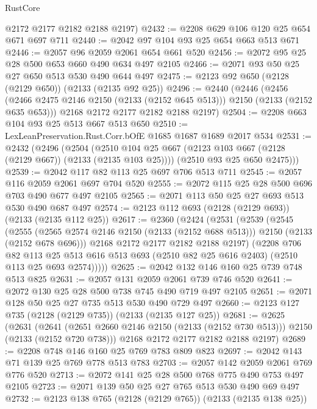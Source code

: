 \begin{lexlean}{RustCore}
\begin{coremodule}
      @2172
      @2177
      @2182
      @2188
      @2197)
@2432 := @2208 @629 @106 @120 @25 @654 @671 @697 @711
@2440 := @2042 @97 @104 @93 @25 @654 @663 @513 @671
@2446 := @2057 @96 @2059 @2061 @654 @661 @520
@2456 := @2072 @95 @25 @28 @500 @653 @660 @490 @634 @497 @2105
@2466 := @2071 @93 @50 @25 @27 @650 @513 @530 @490 @644 @497
@2475 := @2123 @92 @650 (@2128 (@2129 @650)) (@2133 (@2135 @92 @25))
@2496 := @2440
    (@2446
      (@2456 (@2466 @2475 @2146 @2150 (@2133 (@2152 @645 @513))) @2150 (@2133 (@2152 @635 @653)))
      @2168
      @2172
      @2177
      @2182
      @2188
      @2197)
@2504 := @2208 @663 @104 @93 @25 @513 @667 @513 @650
@2510 := LexLeanPreservation.Rust.Corr.bOfE @1685 @1687 @1689 @2017 @534
@2531 := @2432
    (@2496
      (@2504
        (@2510 @104 @25 @667 (@2123 @103 @667 (@2128 (@2129 @667)) (@2133 (@2135 @103 @25))))
        (@2510 @93 @25 @650 @2475)))
@2539 := @2042 @117 @82 @113 @25 @697 @706 @513 @711
@2545 := @2057 @116 @2059 @2061 @697 @704 @520
@2555 := @2072 @115 @25 @28 @500 @696 @703 @490 @677 @497 @2105
@2565 := @2071 @113 @50 @25 @27 @693 @513 @530 @490 @687 @497
@2574 := @2123 @112 @693 (@2128 (@2129 @693)) (@2133 (@2135 @112 @25))
@2617 := @2360
    (@2424
      (@2531
        (@2539
          (@2545
            (@2555
              (@2565 @2574 @2146 @2150 (@2133 (@2152 @688 @513)))
              @2150
              (@2133 (@2152 @678 @696)))
            @2168
            @2172
            @2177
            @2182
            @2188
            @2197)
          (@2208
            @706
            @82
            @113
            @25
            @513
            @616
            @513
            @693
            (@2510 @82 @25 @616 @2403)
            (@2510 @113 @25 @693 @2574)))))
@2625 := @2042 @132 @146 @160 @25 @739 @748 @513 @825
@2631 := @2057 @131 @2059 @2061 @739 @746 @520
@2641 := @2072 @130 @25 @28 @500 @738 @745 @490 @719 @497 @2105
@2651 := @2071 @128 @50 @25 @27 @735 @513 @530 @490 @729 @497
@2660 := @2123 @127 @735 (@2128 (@2129 @735)) (@2133 (@2135 @127 @25))
@2681 := @2625
    (@2631
      (@2641 (@2651 @2660 @2146 @2150 (@2133 (@2152 @730 @513))) @2150 (@2133 (@2152 @720 @738)))
      @2168
      @2172
      @2177
      @2182
      @2188
      @2197)
@2689 := @2208 @748 @146 @160 @25 @769 @783 @809 @823
@2697 := @2042 @143 @71 @139 @25 @769 @778 @513 @783
@2703 := @2057 @142 @2059 @2061 @769 @776 @520
@2713 := @2072 @141 @25 @28 @500 @768 @775 @490 @753 @497 @2105
@2723 := @2071 @139 @50 @25 @27 @765 @513 @530 @490 @69 @497
@2732 := @2123 @138 @765 (@2128 (@2129 @765)) (@2133 (@2135 @138 @25))

\end{coremodule}
\end{lexlean}
